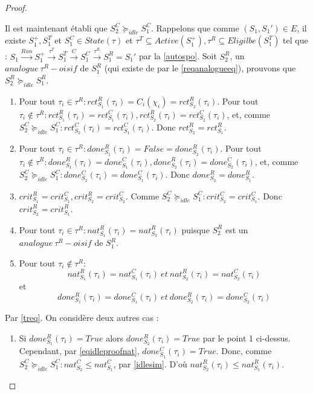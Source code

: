 \documentclass[a4paper]{report}
\theoremstyle{break}
\theoremstyle{breakplain}
\begin{document}
\begin{proof}
\begin{enumerate}
\end{enumerate}

Il est maintenant établi que $S^C_2 \succeq_{idle} S^C_1$. Rappelons que comme $(S_1, S_1') \in E$, il existe $S^{+}_1, S^{T}_1$ et $S^{C}_1 \in State(\tau)$ et $\tau^T \subseteq Active(S^{+}_1),\tau^R \subseteq Eligilbe(S^{T}_1) $ tel que : $S_1\xrightarrow{Run}S^{+}_1\xrightarrow{\tau^T}S^{T}_1\xrightarrow{C}S^{C}_1\xrightarrow{\tau^R}S_1^R=S_1'$ par la \autoref{autospo}. Soit $S_2^R$, un $analogue\ \tau^R-oisif$ de $S_1^R$ (qui existe de par le \autoref{reqanalogueeq}), prouvons que $S_2^R \succeq_{idle} S_1^R$.
\begin{enumerate}
\item Pour tout $\tau_i \in \tau^R : rct_{S_1}^R(\tau_i) = C_i(\chi_i) = rct_{S_2}^R(\tau_i)$. Pour tout $\tau_i \notin \tau^R : rct_{S_1}^R(\tau_i) = rct_{S_1}^C(\tau_i), rct_{S_2}^R(\tau_i) = rct_{S_2}^C(\tau_i)$, et, comme $S^C_2 \succeq_{idle} S^C_1 : rct_{S_2}^C(\tau_i) = rct_{S_1}^C(\tau_i)$. Donc $rct_{S_2}^R = rct_{S_1}^R$.
\item Pour tout $\tau_i \in \tau^R : done_{S_1}^R(\tau_i) = False = done_{S_2}^R(\tau_i)$. Pour tout $\tau_i \notin \tau^R : done_{S_1}^R(\tau_i) = done_{S_1}^C(\tau_i), done_{S_2}^R(\tau_i) = done_{S_2}^C(\tau_i)$, et, comme $S^C_2 \succeq_{idle} S^C_1 : done_{S_2}^C(\tau_i) = done_{S_1}^C(\tau_i)$. Donc $done_{S_2}^R = done_{S_1}^R$.
\item $crit^R_{S_1} = crit^C_{S_1}, crit^R_{S_2} = crit^C_{S_2}$. Comme $S^C_2 \succeq_{idle} S^C_1 : crit^C_{S_2} = crit^C_{S_1}$. Donc $crit^R_{S_2} = crit^R_{S_1}$.
\item Pour tout $\tau_i \in \tau^R : nat_{S_1}^R(\tau_i) = nat_{S_2}^R(\tau_i)$ puisque $S_2^R$ est un $analogue\ \tau^R-oisif$ de $S_1^R$.
\item Pour tout $\tau_i \notin \tau^R :$
\begin{equation}
\label{eqidleproofnat}
nat_{S_1}^R(\tau_i) = nat_{S_1}^C(\tau_i)\ et\ nat_{S_2}^R(\tau_i) = nat_{S_2}^C(\tau_i)
\end{equation}
et 
\begin{equation}
\label{eqidleproofdone}
done_{S_1}^R(\tau_i) = done_{S_1}^C(\tau_i)\ et\ done_{S_2}^R(\tau_i) = done_{S_2}^C(\tau_i)
\end{equation}
\end{enumerate}
Par \autoref{treq}. On considère deux autres cas :
\begin{enumerate}[label=(\alph*)]
\item Si $done_{S_1}^R(\tau_i) = True$ alors $done_{S_2}^R(\tau_i) = True$ par le point 1 ci-dessus. Cependant, par \eqref{eqidleproofnat}, $done_{S_1}^C(\tau_i) = True$. Donc, comme $S^C_2 \succeq_{idle} S^C_1 : nat_{S_2}^C \leq nat_{S_1}^C$, par \autoref{idlesim}. D'où $nat_{S_2}^R(\tau_i) \leq nat_{S_1}^R(\tau_i)$.

\end{enumerate}
\end{proof}
\end{document}
